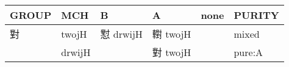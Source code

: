 \documentclass[14pt,a4paper]{scrartcl}
\begin{document}
\begin{longtable}[c]{@{}llllll@{}}
\toprule
\begin{minipage}[b]{0.14\columnwidth}\raggedright\strut
GROUP
\strut\end{minipage} &
\begin{minipage}[b]{0.14\columnwidth}\raggedright\strut
MCH
\strut\end{minipage} &
\begin{minipage}[b]{0.14\columnwidth}\raggedright\strut
B
\strut\end{minipage} &
\begin{minipage}[b]{0.14\columnwidth}\raggedright\strut
A
\strut\end{minipage} &
\begin{minipage}[b]{0.14\columnwidth}\raggedright\strut
none
\strut\end{minipage} &
\begin{minipage}[b]{0.14\columnwidth}\raggedright\strut
PURITY
\strut\end{minipage}\tabularnewline
\midrule
\endhead
\begin{minipage}[t]{0.14\columnwidth}\raggedright\strut
對
\strut\end{minipage} &
\begin{minipage}[t]{0.14\columnwidth}\raggedright\strut
twojH
\strut\end{minipage} &
\begin{minipage}[t]{0.14\columnwidth}\raggedright\strut
懟 drwijH
\strut\end{minipage} &
\begin{minipage}[t]{0.14\columnwidth}\raggedright\strut
轛 twojH
\strut\end{minipage} &
\begin{minipage}[t]{0.14\columnwidth}\raggedright\strut
\strut\end{minipage} &
\begin{minipage}[t]{0.14\columnwidth}\raggedright\strut
mixed
\strut\end{minipage}\tabularnewline
\begin{minipage}[t]{0.14\columnwidth}\raggedright\strut
𡭊
\strut\end{minipage} &
\begin{minipage}[t]{0.14\columnwidth}\raggedright\strut
drwijH
\strut\end{minipage} &
\begin{minipage}[t]{0.14\columnwidth}\raggedright\strut
\strut\end{minipage} &
\begin{minipage}[t]{0.14\columnwidth}\raggedright\strut
對 twojH
\strut\end{minipage} &
\begin{minipage}[t]{0.14\columnwidth}\raggedright\strut
\strut\end{minipage} &
\begin{minipage}[t]{0.14\columnwidth}\raggedright\strut
pure:A
\strut\end{minipage}\tabularnewline
\bottomrule
\end{longtable}
\end{document}
